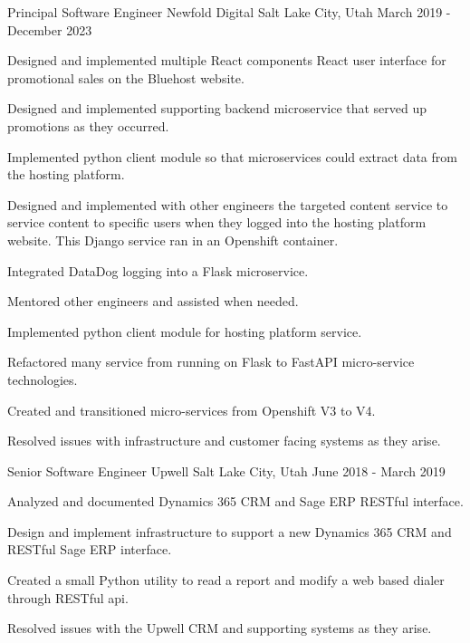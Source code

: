 \begin{cventries}
\cventry
{Principal Software Engineer} %
{Newfold Digital} %
{Salt Lake City, Utah} %
{March 2019 - December 2023} %
{
	\begin{cvitems} %
		\item {Designed and implemented multiple React components React user interface for promotional sales on the Bluehost website.}
		\item {Designed and implemented supporting backend microservice that served up promotions as they occurred.}
		\item {Implemented python client module so that microservices could extract data from the hosting platform.}
		\item {Designed and implemented with other engineers the targeted content service to service content to specific users when they logged into the hosting platform website. This Django service ran in an Openshift container. }
		\item {Integrated DataDog logging into a Flask microservice.}
		\item {Mentored other engineers and assisted when needed.}
		\item {Implemented python client module for hosting platform service.}
		\item {Refactored many service from running on Flask to FastAPI micro-service technologies.}
		\item {Created and transitioned micro-services from Openshift V3 to V4.}
		\item {Resolved issues with infrastructure and customer facing systems as they arise.}
	\end{cvitems}
}

\cventry
{Senior Software Engineer} %
{Upwell} %
{Salt Lake City, Utah} %
{June 2018 - March 2019} %
{
	\begin{cvitems} %
		\item {Analyzed and documented Dynamics 365 CRM and Sage ERP RESTful interface.}
		\item {Design and implement infrastructure to support a new Dynamics 365 CRM and RESTful Sage ERP interface.}
		\item {Created a small Python utility to read a report and modify a web based dialer through RESTful api.}
		\item {Resolved issues with the Upwell CRM and supporting systems as they arise.}
	\end{cvitems}
}


\end{cventries}
